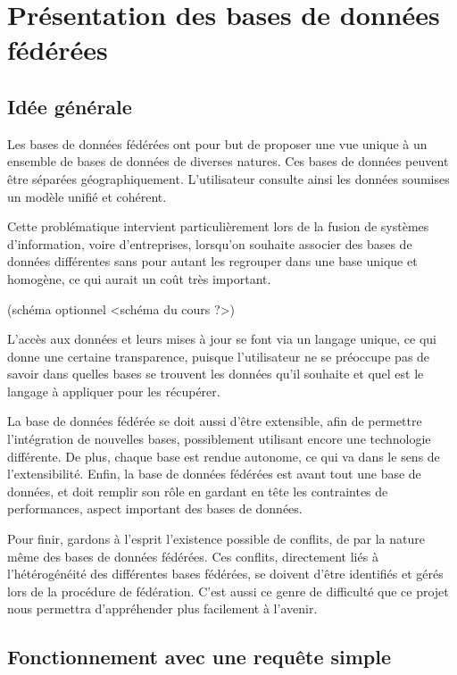 \section{Présentation des bases de données fédérées}

\subsection{Idée générale}

Les bases de données fédérées ont pour but de proposer une vue unique à un ensemble de bases de données de diverses natures. Ces bases de données peuvent être séparées géographiquement. L’utilisateur consulte ainsi les données soumises un modèle unifié et cohérent.

Cette problématique intervient particulièrement lors de la fusion de systèmes d’information, voire d’entreprises, lorsqu’on souhaite associer des bases de données différentes sans pour autant les regrouper dans une base unique et homogène, ce qui aurait un coût très important.

(schéma optionnel <schéma du cours ?>)

L’accès aux données et leurs mises à jour se font via un langage unique, ce qui donne une certaine transparence, puisque l’utilisateur ne se préoccupe pas de savoir dans quelles bases se trouvent les données qu’il souhaite et quel est le langage à appliquer pour les récupérer.

La base de données fédérée se doit aussi d’être extensible, afin de permettre l’intégration de nouvelles bases, possiblement utilisant encore une technologie différente. De plus, chaque base est rendue autonome, ce qui va dans le sens de l’extensibilité. Enfin, la base de données fédérées est avant tout une base de données, et doit remplir son rôle en gardant en tête les contraintes de performances, aspect important des bases de données.

Pour finir, gardons à l’esprit l’existence possible de conflits, de par la nature même des bases de données fédérées. Ces conflits, directement liés à l’hétérogénéité des différentes bases fédérées, se doivent d’être identifiés et gérés lors de la procédure de fédération. C’est aussi ce genre de difficulté que ce projet nous permettra d’appréhender plus facilement à l’avenir.


\subsection{Fonctionnement avec une requête simple}

